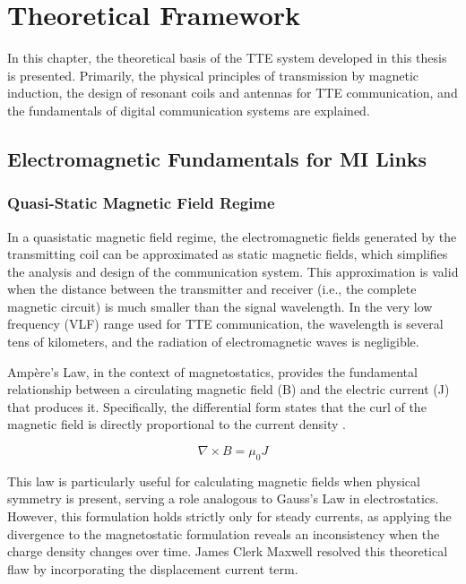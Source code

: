 \chapter{Theoretical Framework}\label{ch:theoretical-framework}

In this chapter, the theoretical basis of the TTE system developed in this thesis is presented. Primarily, the physical principles of transmission by magnetic induction, the design of resonant coils and antennas for TTE communication, and the fundamentals of digital communication systems are explained.

\section{Electromagnetic Fundamentals for MI Links}\label{sec:em-fundamentals}

\subsection{Quasi-Static Magnetic Field Regime}\label{subsec:quasi-static}
In a quasistatic magnetic field regime, the electromagnetic fields generated by the transmitting coil can be approximated as static magnetic fields, which simplifies the analysis and design of the communication system. This approximation is valid when the distance between the transmitter and receiver (i.e., the complete magnetic circuit) is much smaller than the signal wavelength. In the very low frequency (VLF) range used for TTE communication, the wavelength is several tens of kilometers, and the radiation of electromagnetic waves is negligible.
\newp

Ampère's Law, in the context of magnetostatics, provides the fundamental relationship between a circulating magnetic field (B) and the electric current (J) that produces it. Specifically, the differential form states that the curl of the magnetic field is directly proportional to the current density \cite{griffiths2023introduction}.

\begin{equation}
    \label{equation_of_ampere_law}
    \nabla \times B = \mu_{0} J
\end{equation}

This law is particularly useful for calculating magnetic fields when physical symmetry is present, serving a role analogous to Gauss's Law in electrostatics. However, this formulation holds strictly only for steady currents, as applying the divergence to the magnetostatic formulation reveals an inconsistency when the charge density changes over time. James Clerk Maxwell resolved this theoretical flaw by incorporating the displacement current term.


